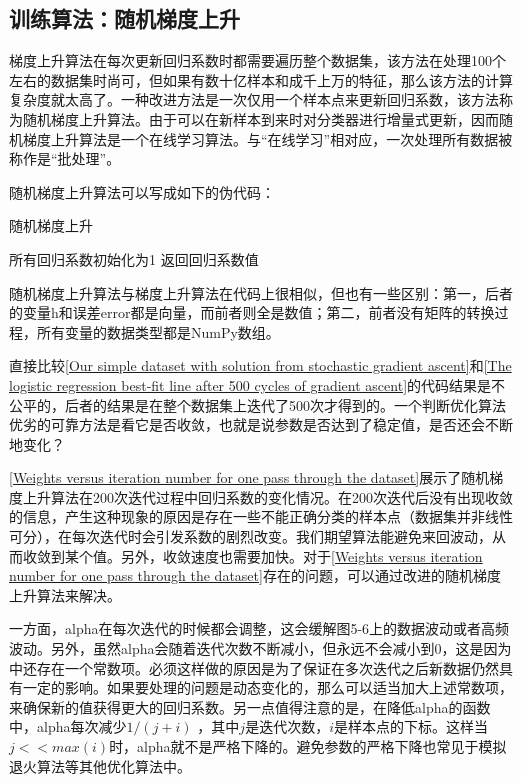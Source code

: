 
\subsection{训练算法：随机梯度上升}
梯度上升算法在每次更新回归系数时都需要遍历整个数据集，该方法在处理100个左右的数据集时尚可，但如果有数十亿样本和成千上万的特征，那么该方法的计算复杂度就太高了。一种改进方法是一次仅用一个样本点来更新回归系数，该方法称为随机梯度上升算法。由于可以在新样本到来时对分类器进行增量式更新，因而随机梯度上升算法是一个在线学习算法。与“在线学习”相对应，一次处理所有数据被称作是“批处理”。

随机梯度上升算法可以写成如下的伪代码：

\begin{algorithm}
    \caption{随机梯度上升}
    所有回归系数初始化为1\;
    \Return 返回回归系数值
\end{algorithm}

随机梯度上升算法与梯度上升算法在代码上很相似，但也有一些区别：第一，后者的变量h和误差error都是向量，而前者则全是数值；第二，前者没有矩阵的转换过程，所有变量的数据类型都是NumPy数组。


直接比较\autoref{Our simple dataset with solution from stochastic gradient ascent}和\autoref{The logistic regression best-fit line after 500 cycles of gradient ascent}的代码结果是不公平的，后者的结果是在整个数据集上迭代了500次才得到的。一个判断优化算法优劣的可靠方法是看它是否收敛，也就是说参数是否达到了稳定值，是否还会不断地变化？


\autoref{Weights versus iteration number for one pass through the dataset}展示了随机梯度上升算法在200次迭代过程中回归系数的变化情况。在200次迭代后没有出现收敛的信息，产生这种现象的原因是存在一些不能正确分类的样本点（数据集并非线性可分），在每次迭代时会引发系数的剧烈改变。我们期望算法能避免来回波动，从而收敛到某个值。另外，收敛速度也需要加快。对于\autoref{Weights versus iteration number for one pass through the dataset}存在的问题，可以通过改进的随机梯度上升算法来解决。

一方面，alpha在每次迭代的时候都会调整，这会缓解图5-6上的数据波动或者高频波动。另外，虽然alpha会随着迭代次数不断减小，但永远不会减小到0，这是因为中还存在一个常数项。必须这样做的原因是为了保证在多次迭代之后新数据仍然具有一定的影响。如果要处理的问题是动态变化的，那么可以适当加大上述常数项，来确保新的值获得更大的回归系数。另一点值得注意的是，在降低alpha的函数中，alpha每次减少$1/(j+i)$ ，其中$j$是迭代次数，$i$是样本点的下标。这样当$j<<max(i)$时，alpha就不是严格下降的。避免参数的严格下降也常见于模拟退火算法等其他优化算法中。

